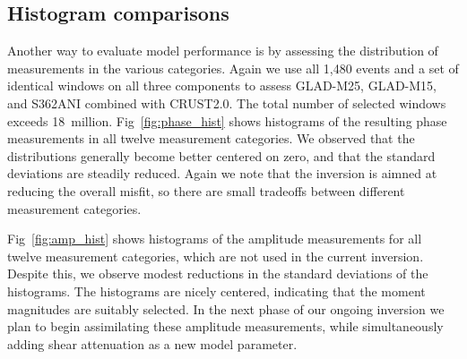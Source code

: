 \documentclass[extra,mreferee]{gji}
\begin{document}

\subsection{Histogram comparisons}

Another way to evaluate model performance is by assessing the distribution
of measurements in the various categories.
Again we use all 1,480 events and a set of identical windows on all three components
to assess GLAD-M25, GLAD-M15, and S362ANI combined with CRUST2.0.
The total number of selected windows exceeds 18~million.
Fig~\ref{fig:phase_hist} shows histograms of the resulting phase
measurements in all twelve measurement categories.
We observed that the distributions generally become better centered on zero,
and that the standard deviations are steadily reduced.
Again we note that the inversion is aimned at reducing the overall misfit,
so there are small tradeoffs between different measurement categories.

Fig~\ref{fig:amp_hist} shows histograms of the amplitude
measurements for all twelve measurement categories,
which are not used in the current inversion.
Despite this,
we observe modest reductions in the standard deviations of the histograms.
The histograms are nicely centered, indicating that the moment magnitudes are suitably selected.
In the next phase of our ongoing inversion we plan to begin assimilating these amplitude measurements,
while simultaneously adding shear attenuation as a new model parameter.
\end{document}
